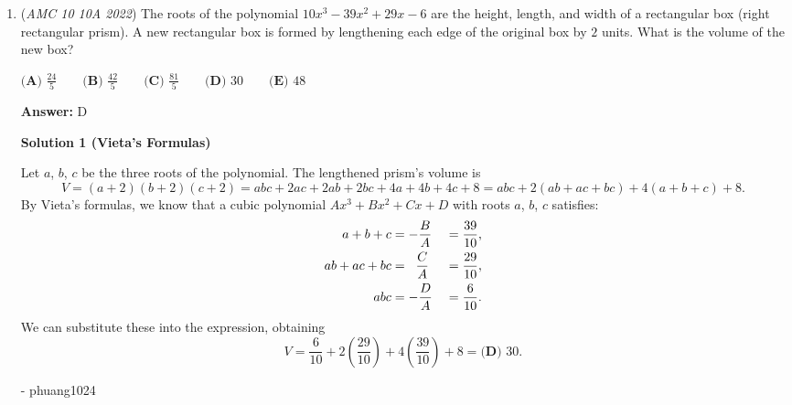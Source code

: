\begin{enumerate}
 -jb2015007

 



\textbf{Solution 5 (Cheese)}

We can observe that $7{-}24{-}25$ and $15{-}20{-}25$ are both very common Pythagorean triples, so we can guess that $AC=25.$ And since the hypotenuse is $25$, the area of the circle is $(\frac{25}{2})^2=\frac{625}{4}\pi.$ Therefore, the area of the circle excluding $ABCD$ is $\frac{625}{4}\pi-\frac{7\times24}{2}-\frac{15\times20}{2}=\frac{625}{4}\pi-234=\frac{625\pi-936}{4}$. So, the answer is $625+936+4=\boxed{\textbf{(D) }1565}.$ Also note this satisfies the constraints of the problem, as by the Supplementary Opposite Angles Theorem, we can determine that $ABCD$ is a cyclic quadrilateral.

 


	\item (\textit{AMC 10 10A 2022}) The roots of the polynomial $10x^3 - 39x^2 + 29x - 6$ are the height, length, and width of a rectangular box (right rectangular prism). A new rectangular box is formed by lengthening each edge of the original box by $2$ units. What is the volume of the new box?


 $\textbf{(A) } \frac{24}{5} \qquad \textbf{(B) } \frac{42}{5} \qquad \textbf{(C) } \frac{81}{5} \qquad \textbf{(D) } 30 \qquad \textbf{(E) } 48$

 \textbf{Answer: }D



\textbf{Solution 1 (Vieta's Formulas)}

Let $a$, $b$, $c$ be the three roots of the polynomial. The lengthened prism's volume is 
 \[V = (a+2)(b+2)(c+2) = abc + 2ac + 2ab + 2bc + 4a + 4b + 4c + 8 = abc + 2(ab+ac+bc) + 4(a+b+c) + 8.\]By Vieta's formulas, we know that a cubic polynomial $Ax^3+Bx^2+Cx+D$ with roots $a$, $b$, $c$ satisfies:
 \begin{alignat*}{8} a+b+c &= -\frac{B}{A} &&= \frac{39}{10}, \\ ab+ac+bc &= \hspace{2mm}\frac{C}{A} &&= \frac{29}{10}, \\ abc &= -\frac{D}{A} &&= \frac{6}{10}. \end{alignat*}We can substitute these into the expression, obtaining 
 \[V = \frac{6}{10} + 2\left(\frac{29}{10}\right) + 4\left(\frac{39}{10}\right) + 8 = \boxed{\textbf{(D) } 30}.\]

 - phuang1024

 




\end{enumerate}
